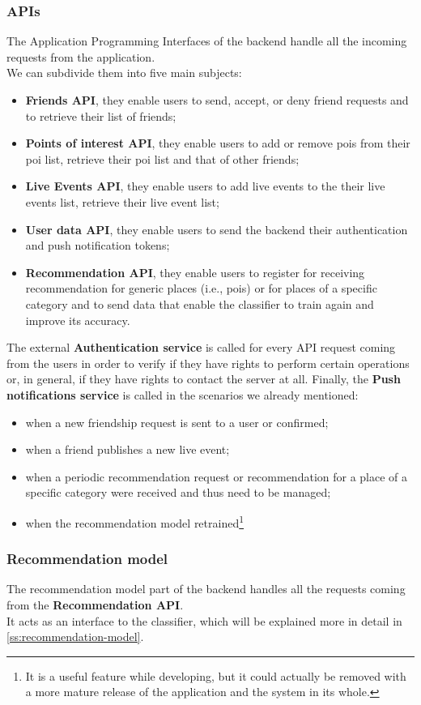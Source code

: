 \documentclass[../../main]{subfiles}
\begin{document}
\subsubsection{APIs}
The Application Programming Interfaces of the backend handle all the incoming requests from the application.\\
We can subdivide them into five main subjects:
\begin{itemize}
    \item \textbf{Friends API}, they enable users to send, accept, or deny friend requests and to retrieve their list of friends;
    \item \textbf{Points of interest API}, they enable users to add or remove pois from their poi list, retrieve their poi list and that of other friends;
    \item \textbf{Live Events API}, they enable users to add live events to the their live events list, retrieve their live event list;
    \item \textbf{User data API}, they enable users to send the backend their authentication and push notification tokens;
    \item \textbf{Recommendation API}, they enable users to register for receiving recommendation for generic places (i.e., pois) or for places of a specific category and to send data that enable the classifier to train again and improve its accuracy.
\end{itemize}
The external \textbf{Authentication service} is called for every API request coming from the users in order to verify if they have rights to perform certain operations or, in general, if they have rights to contact the server at all.
Finally, the \textbf{Push notifications service} is called in the scenarios we already mentioned:
\begin{itemize}
    \item when a new friendship request is sent to a user or confirmed;
    \item when a friend publishes a new live event;
    \item when a periodic recommendation request or recommendation for a place of a specific category were received and thus need to be managed;
    \item when the recommendation model retrained\footnote{It is a useful feature while developing, but it could actually be removed with a more mature release of the application and the system in its whole.}
\end{itemize}

\label{sss:recommendation-model}
\subsubsection{Recommendation model}
The recommendation model part of the backend handles all the requests coming from the \textbf{Recommendation API}.\\
It acts as an interface to the classifier, which will be explained more in detail in \ref{ss:recommendation-model}.
\end{document}

